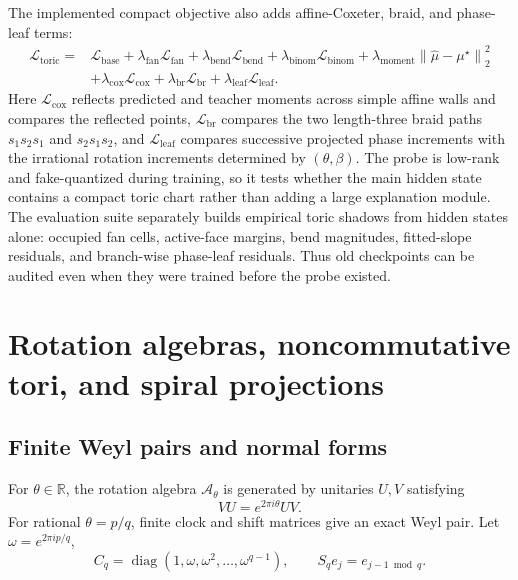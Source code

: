 \documentclass[11pt]{article}
\theoremstyle{definition}
\theoremstyle{plain}
\theoremstyle{remark}
\numberwithin{equation}{section}
\newcommand{\R}{\mathbb{R}}
\newcommand{\A}{\mathcal{A}}
\newcommand{\diag}{\operatorname{diag}}
\newcommand{\norm}[1]{\left\lVert #1\right\rVert}
\begin{document}
The implemented compact objective also adds affine-Coxeter, braid, and phase-leaf terms:
\begin{equation}
\begin{split}
  \mathcal L_{\mathrm{toric}}
  ={}&\mathcal L_{\mathrm{base}}
  +\lambda_{\mathrm{fan}}\mathcal L_{\mathrm{fan}}
  +\lambda_{\mathrm{bend}}\mathcal L_{\mathrm{bend}}
  +\lambda_{\mathrm{binom}}\mathcal L_{\mathrm{binom}}
  +\lambda_{\mathrm{moment}}\norm{\widehat\mu-\mu^\star}_2^2\\
  &+\lambda_{\mathrm{cox}}\mathcal L_{\mathrm{cox}}
  +\lambda_{\mathrm{br}}\mathcal L_{\mathrm{br}}
  +\lambda_{\mathrm{leaf}}\mathcal L_{\mathrm{leaf}}.
\end{split}
\end{equation}
Here $\mathcal L_{\mathrm{cox}}$ reflects predicted and teacher moments across simple affine walls and compares the reflected points, $\mathcal L_{\mathrm{br}}$ compares the two length-three braid paths $s_1s_2s_1$ and $s_2s_1s_2$, and $\mathcal L_{\mathrm{leaf}}$ compares successive projected phase increments with the irrational rotation increments determined by $(\theta,\beta)$.  The probe is low-rank and fake-quantized during training, so it tests whether the main hidden state contains a compact toric chart rather than adding a large explanation module.  The evaluation suite separately builds empirical toric shadows from hidden states alone: occupied fan cells, active-face margins, bend magnitudes, fitted-slope residuals, and branch-wise phase-leaf residuals.  Thus old checkpoints can be audited even when they were trained before the probe existed.

\section{Rotation algebras, noncommutative tori, and spiral projections}

\subsection{Finite Weyl pairs and normal forms}

For $\theta\in\R$, the rotation algebra $\A_\theta$ is generated by unitaries $U,V$ satisfying
\begin{equation}
  VU=e^{2\pi i\theta}UV.
\end{equation}
For rational $\theta=p/q$, finite clock and shift matrices give an exact Weyl pair.  Let $\omega=e^{2\pi i p/q}$,
\begin{equation}
  C_q=\diag(1,\omega,\omega^2,\ldots,\omega^{q-1}),\qquad S_q e_j=e_{j-1\bmod q}.
\end{equation}
\end{document}
